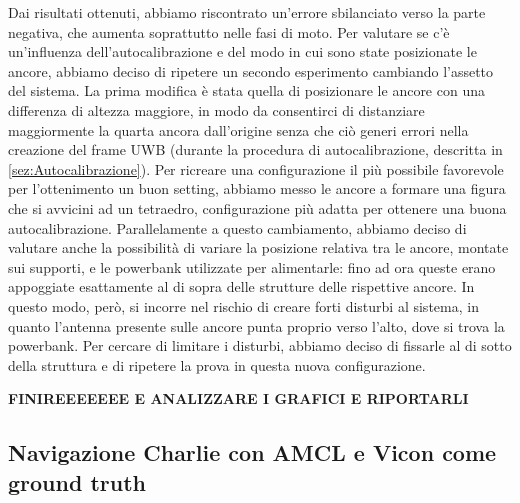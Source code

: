 Dai risultati ottenuti, abbiamo riscontrato un'errore sbilanciato verso la parte negativa, che aumenta soprattutto nelle fasi di moto. Per valutare se c'è un'influenza 
dell'autocalibrazione e del modo in cui sono state posizionate le ancore, abbiamo deciso di ripetere un secondo esperimento cambiando l'assetto del sistema. La prima modifica è stata quella di posizionare le ancore con una differenza di altezza maggiore, in modo da consentirci 
di distanziare maggiormente la quarta ancora dall'origine senza che ciò generi errori nella creazione del frame UWB (durante la procedura di autocalibrazione, 
descritta in \ref{sez:Autocalibrazione}). Per ricreare una configurazione il più possibile favorevole per l'ottenimento un buon setting, abbiamo messo le ancore 
a formare una figura che si avvicini ad un tetraedro, configurazione più adatta per ottenere una buona autocalibrazione.
Parallelamente a questo cambiamento, abbiamo deciso di valutare anche la possibilità di variare la posizione relativa tra le ancore, montate sui supporti, e 
le powerbank utilizzate per alimentarle: fino ad ora queste erano appoggiate esattamente al di sopra delle strutture delle rispettive ancore. In questo modo, 
però, si incorre nel rischio di creare forti disturbi al sistema, in quanto l'antenna presente sulle ancore punta proprio verso l'alto, dove si trova la powerbank. 
Per cercare di limitare i disturbi, abbiamo deciso di fissarle al di sotto della struttura e di ripetere la prova in questa nuova configurazione.

\textbf{FINIREEEEEEE E ANALIZZARE I GRAFICI E RIPORTARLI }

\subsection{Navigazione Charlie con AMCL e Vicon come ground truth}

